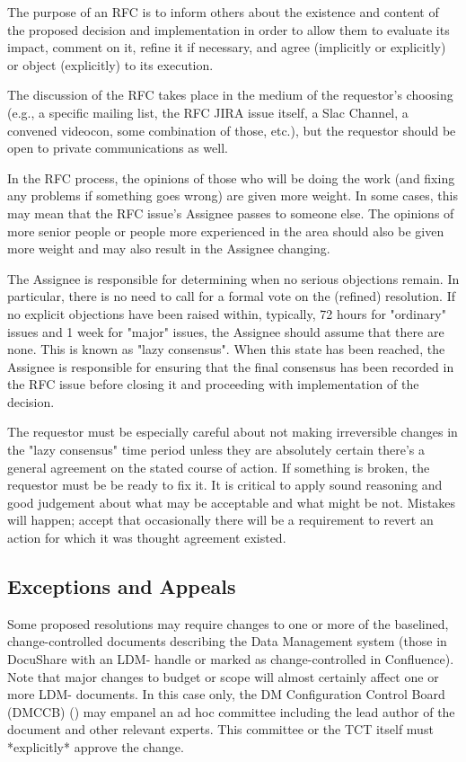 The purpose of an RFC is to inform others about the existence and content of the proposed decision and implementation in order to allow them to evaluate its impact, comment on it, refine it if necessary, and agree (implicitly or explicitly) or object (explicitly) to its execution.

The discussion of the RFC takes place in the medium of the requestor's choosing (e.g., a specific mailing list, the RFC JIRA issue itself, a Slac Channel, a convened videocon, some combination of those, etc.), but the requestor should be open to private communications as well.

In the RFC process, the opinions of those who will be doing the work (and fixing any problems if something goes wrong) are given more weight. In some cases, this may mean that the RFC issue's Assignee passes to someone else. The opinions of more senior people or people more experienced in the area should also be given more weight and may also result in the Assignee changing.

The Assignee is responsible for determining when no serious objections remain.  In particular, there is no need to call for a formal vote on the (refined) resolution. If no explicit objections have been raised within, typically, 72 hours for "ordinary" issues and 1 week for "major" issues, the Assignee should assume that there are none. This is known as "lazy consensus". When this state has been reached, the Assignee is responsible for ensuring that the final consensus has been recorded in the RFC issue before closing it and proceeding with implementation of the decision.

The requestor must be especially careful about not making irreversible changes in the "lazy consensus" time period unless they are absolutely certain there's a general agreement on the stated course of action. If something is broken, the requestor must be be ready to fix it. It is critical to apply sound reasoning and good judgement about what may be acceptable and what might be not. Mistakes will happen; accept that occasionally there will be a requirement to revert an action for which it was thought agreement existed.

\subsection{Exceptions and Appeals}
Some proposed resolutions may require changes to one or more of the baselined, change-controlled documents describing the Data Management system (those in DocuShare with an LDM- handle or marked as change-controlled in Confluence).  Note that major changes to budget or scope will almost certainly affect one or more LDM- documents.  In this case only, the DM Configuration Control Board (DMCCB) ()  may empanel an ad hoc committee including the lead author of the document and other relevant experts. This committee or the TCT itself must *explicitly* approve the change.

